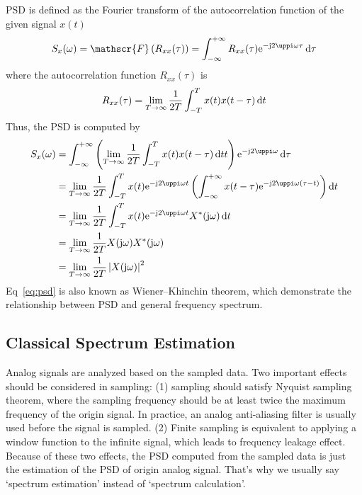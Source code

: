 PSD is defined as the Fourier transform of the autocorrelation function of the given signal $x(t)$
\begin{equation}
    S_x(\omega) = \mathscr{F}\left(R_{xx}(\tau)\right) = \int_{-\infty}^{+\infty} R_{xx}(\tau) \iexp{-\mathrm{j} 2 \uppi \omega \tau} \diff \tau
\end{equation}
where the autocorrelation function $R_{xx}(\tau)$ is 
\begin{equation}
    R_{xx}(\tau) = \lim_{T\to \infty} \frac{1}{2T}\int_{-T}^{T} x(t) x(t-\tau)  \mathop{}\!\mathrm{d} t
\end{equation}
Thus, the PSD is computed by
\begin{align}
    S_x(\omega) &= \int_{-\infty}^{+\infty} \left(\lim_{T\to \infty} \frac{1}{2T}\int_{-T}^{T} x(t) x(t-\tau)  \diff t t\right) \iexp{-\mathrm{j} 2 \uppi \omega} \diff \tau \notag \\ 
    &= \lim_{T\to \infty} \frac{1}{2T} \int_{-T}^{T} x(t)\iexp{-\mathrm{j} 2 \uppi \omega t} \left( \int_{-\infty}^{+\infty} x(t-\tau) \iexp{-\mathrm{j} 2 \uppi \omega \left(\tau-t\right)} \right) \diff t \notag \\
    &= \lim_{T\to \infty} \frac{1}{2T} \int_{-T}^{T} x(t)\iexp{-\mathrm{j} 2 \uppi \omega t} X^*(\jomega) \diff t \notag \\
    &= \lim_{T\to \infty} \frac{1}{2T} X(\jomega) X^*(\jomega) \notag \\
    &= \lim_{T\to \infty} \frac{1}{2T} \left| X(\jomega) \right|^2
        \label{eq:psd}
\end{align}
Eq~\eqref{eq:psd} is also known as Wiener–Khinchin theorem, which demonstrate the relationship between PSD and general frequency spectrum.




\subsection{Classical Spectrum Estimation}


Analog signals are analyzed based on the sampled data. Two important effects should be considered in sampling: (1) sampling should satisfy Nyquist sampling theorem, where the sampling frequency should be at least twice the maximum frequency of the origin signal. In practice, an analog anti-aliasing filter is usually used before the signal is sampled. (2) Finite sampling is equivalent to applying a window function to the infinite signal, which leads to frequency leakage effect. Because of these two effects, the PSD computed from the sampled data is just the estimation of the PSD of origin analog signal. That's why we usually say `spectrum estimation' instead of `spectrum calculation'.


